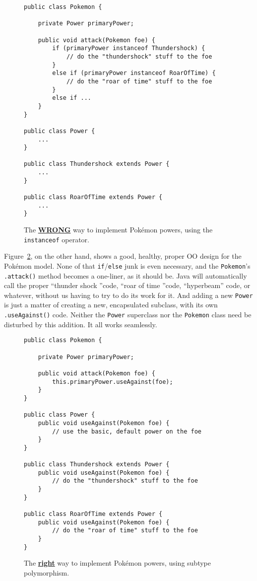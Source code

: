 \begin{figure}[ht]
\begin{Verbatim}[fontsize=\small,samepage=true,frame=single]
public class Pokemon {

    private Power primaryPower;

    public void attack(Pokemon foe) {
        if (primaryPower instanceof Thundershock) {
            // do the "thundershock" stuff to the foe
        }
        else if (primaryPower instanceof RoarOfTime) {
            // do the "roar of time" stuff to the foe
        }       
        else if ...
    }
}

public class Power {
    ...
}

public class Thundershock extends Power {
    ...
}

public class RoarOfTime extends Power {
    ...
}
\end{Verbatim}
\caption{The {\color{red} \underline{\textbf{WRONG}}} way to implement
Pok\'{e}mon powers, using the \texttt{instanceof} operator.}
\label{fig:wrongPokemon}
\end{figure}

Figure~\ref{fig:rightPokemon}, on the other hand, shows a good, healthy,
proper OO design for the Pok\'{e}mon model. None of that
\texttt{if}/\texttt{else} junk is even necessary, and the \texttt{Pokemon}'s
\texttt{.attack()} method becomes a one-liner, as it should be. Java will
automatically call the proper ``thunder shock ''code, ``roar of time ''code,
``hyperbeam'' code, or whatever, without us having to try to do its work for
it. And adding a new \texttt{Power} is just a matter of creating a new,
encapsulated subclass, with its own \texttt{.useAgainst()} code. Neither the
\texttt{Power} superclass nor the \texttt{Pokemon} class need be disturbed by
this addition. It all works seamlessly.

\begin{figure}[ht]
\begin{Verbatim}[fontsize=\small,samepage=true,frame=single]
public class Pokemon {

    private Power primaryPower;

    public void attack(Pokemon foe) {
        this.primaryPower.useAgainst(foe);
    }
}

public class Power {
    public void useAgainst(Pokemon foe) {
        // use the basic, default power on the foe
    }
}

public class Thundershock extends Power {
    public void useAgainst(Pokemon foe) {
        // do the "thundershock" stuff to the foe
    }
}

public class RoarOfTime extends Power {
    public void useAgainst(Pokemon foe) {
        // do the "roar of time" stuff to the foe
    }
}
\end{Verbatim}
\caption{The {\color{darkgreen} \underline{\textbf{right}}} way to implement
Pok\'{e}mon powers, using subtype polymorphism.}
\label{fig:rightPokemon}
\end{figure}
